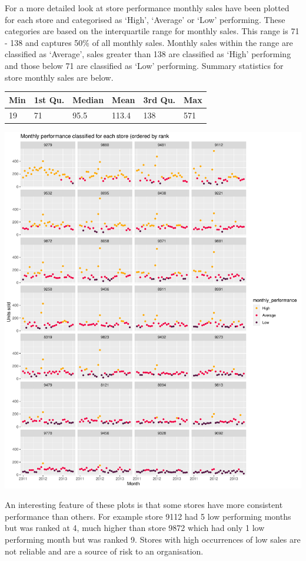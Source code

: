 \documentclass[
  11pt,
]{article}
\begin{document}
For a more detailed look at store performance monthly sales have been
plotted for each store and categorised as `High', `Average' or `Low'
performing. These categories are based on the interquartile range for
monthly sales. This range is 71 - 138 and captures 50\% of all monthly
sales. Monthly sales within the range are classified as `Average', sales
greater than 138 are classified as `High' performing and those below 71
are classified as `Low' performing. Summary statistics for store monthly
sales are below.

\begin{longtable}[]{@{}llllll@{}}
\toprule
Min & 1st Qu. & Median & Mean & 3rd Qu. & Max \\
\midrule
\endhead
19 & 71 & 95.5 & 113.4 & 138 & 571 \\
\bottomrule
\end{longtable}

\includegraphics{Assignment-STAT702---final_files/figure-latex/store plots-1.pdf}

An interesting feature of these plots is that some stores have more
consistent performance than others. For example store 9112 had 5 low
performing months but was ranked at 4, much higher than store 9872 which
had only 1 low performing month but was ranked 9. Stores with high
occurrences of low sales are not reliable and are a source of risk to an
organisation.
\end{document}
